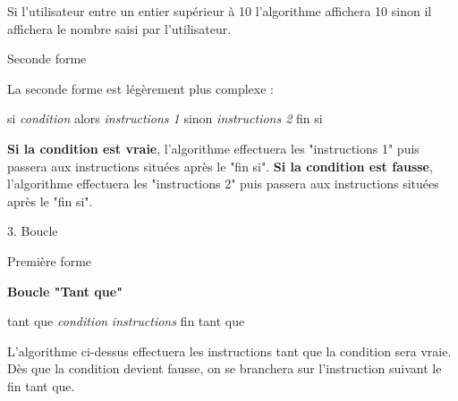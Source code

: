 Si l'utilisateur entre un entier supérieur à 10 l'algorithme affichera 10 sinon il affichera le nombre saisi par l'utilisateur.
\begin{h3}Seconde forme\end{h3}
La seconde forme est légèrement plus complexe :
\begin{code}
si \textit{condition} alors
     \textit{instructions 1}
sinon
     \textit{instructions 2}
fin si
\end{code}
\textbf{Si la condition est vraie}, l'algorithme effectuera les "instructions 1" puis passera aux instructions situées après le "fin si".
\textbf{Si la condition est fausse}, l'algorithme effectuera les "instructions 2" puis passera aux instructions situées après le "fin si".
\begin{h2}3. Boucle\end{h2}
\begin{h3}Première forme\end{h3}
\textbf{ Boucle "Tant que" }
\begin{code}
tant que \textit{condition}
     \textit{instructions}
fin tant que
\end{code}
L'algorithme ci-dessus effectuera les instructions tant que la condition sera vraie. Dès que la condition devient fausse, on se branchera sur l'instruction suivant le fin tant que.
